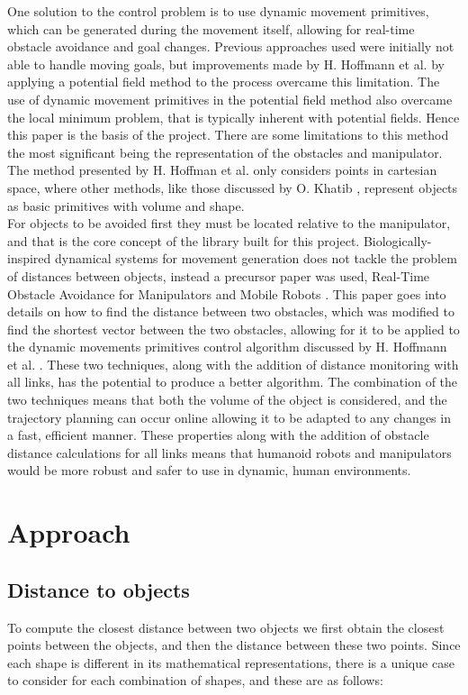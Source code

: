 \documentclass[a4paper, 10pt, conference]{ieeeconf}      %
\begin{document}
One solution to the control problem is to use dynamic movement primitives, which can be generated during the movement itself, allowing for real-time obstacle avoidance and goal changes. Previous approaches \cite{Janabi-Sharif} used were initially not able to handle moving goals, but improvements made by H. Hoffmann et al. \cite{Hoffmann} by applying a potential field method to the process overcame this limitation. The use of dynamic movement primitives in the potential field method also overcame the local minimum problem, that is typically inherent with potential fields. Hence this paper is the basis of the project. There are some limitations to this method the most significant being the representation of the obstacles and manipulator. The method presented by H. Hoffman et al.\cite{Hoffmann} only considers points in cartesian space, where other methods, like those discussed by O. Khatib \cite{Khatib}, represent objects as basic primitives with volume and shape. \\

For objects to be avoided first they must be located relative to the manipulator, and that is the core concept of the library built for this project. Biologically-inspired dynamical systems for movement generation \cite{Hoffmann} does not tackle the problem of distances between objects, instead a precursor paper was used, Real-Time Obstacle Avoidance for Manipulators and Mobile Robots \cite{Khatib}. This paper goes into details on how to find the distance between two obstacles, which was modified to find the shortest vector between the two obstacles, allowing for it to be applied to the dynamic movements primitives control algorithm discussed by H. Hoffmann et al. \cite{Hoffmann}. These two techniques, along with the addition of distance monitoring with all links, has the potential to produce a better algorithm. The combination of the two techniques means that both the volume of the object is considered, and the trajectory planning can occur online allowing it to be adapted to any changes in a fast, efficient manner. These properties along with the addition of obstacle distance calculations for all links means that humanoid robots and manipulators would be more robust and safer to use in dynamic, human environments.

\section{Approach}

\subsection{Distance to objects} %
To compute the closest distance between two objects we first obtain the closest points between the objects, and then the distance between these two points. Since each shape is different in its mathematical representations, there is a unique case to consider for each combination of shapes, and these are as follows:
\end{document}
